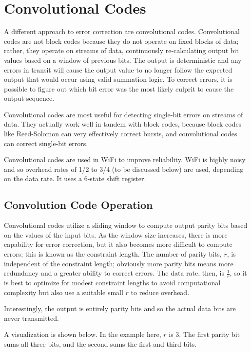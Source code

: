 \documentclass[12pt]{article}
\begin{document}
\section{Convolutional Codes}

A different approach to error correction are convolutional codes. Convolutional codes are not block codes because they do not operate on fixed blocks of data; rather, they operate on streams of data, continuously re-calculating output bit values based on a window of previous bits. The output is deterministic and any errors in transit will cause the output value to no longer follow the expected output that would occur using valid summation logic. To correct errors, it is possible to figure out which bit error was the most likely culprit to cause the output sequence.

Convolutional codes are most useful for detecting single-bit errors on streams of data. They actually work well in tandem with block codes, because block codes like Reed-Solomon can very effectively correct bursts, and convolutional codes can correct single-bit errors.  \cite{tanenbaum}

Convolutional codes are used in WiFi to improve reliability. WiFi is highly noisy and so overhead rates of 1/2 to 3/4 (to be discussed below) are used, depending on the data rate. It uses a 6-state shift register. \cite{wlan} 


\subsection{Convolution Code Operation}

Convolutional codes utilize a sliding window to compute output parity bits based on the values of the input bits. As the window size increases, there is more capability for error correction, but it also becomes more difficult to compute errors; this is known as the constraint length. The number of parity bits, $r$, is independent of the constraint length; obviously more parity bits means more redundancy and a greater ability to correct errors. The data rate, then, is $\frac{1}{r}$, so it is best to optimize for modest constraint lengths to avoid computational complexity but also use a suitable small $r$ to reduce overhead. 

Interestingly, the output is entirely parity bits and so the actual data bits are never transmitted. 

A visualization is shown below. In the example here, $r$ is 3. The first parity bit sums all three bits, and the second sums the first and third bits.
\end{document}
